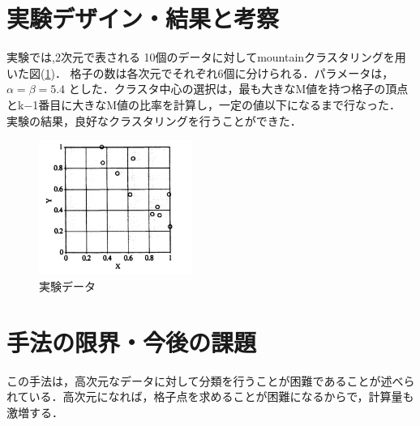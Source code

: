 \documentclass[10pt,onecolumn]{jsarticle}
\begin{document}
\section{実験デザイン・結果と考察}
実験では,2次元で表される 10個のデータに対してmountainクラスタリングを用いた図(\ref{figure})．
格子の数は各次元でそれぞれ6個に分けられる．パラメータは，$\alpha = \beta = 5.4$ とした．クラスタ中心の選択は，最も大きなM値を持つ格子の頂点とk−1番目に大きなM値の比率を計算し，一定の値以下になるまで行なった．
実験の結果，良好なクラスタリングを行うことができた．
	\begin{figure}
		\label{figure}
	\centering
	\includegraphics[width=5cm]{figure.png}
	\caption{実験データ}
\end{figure}
\section{手法の限界・今後の課題}
この手法は，高次元なデータに対して分類を行うことが困難であることが述べられている．高次元になれば，格子点を求めることが困難になるからで，計算量も激増する．



\end{document}
